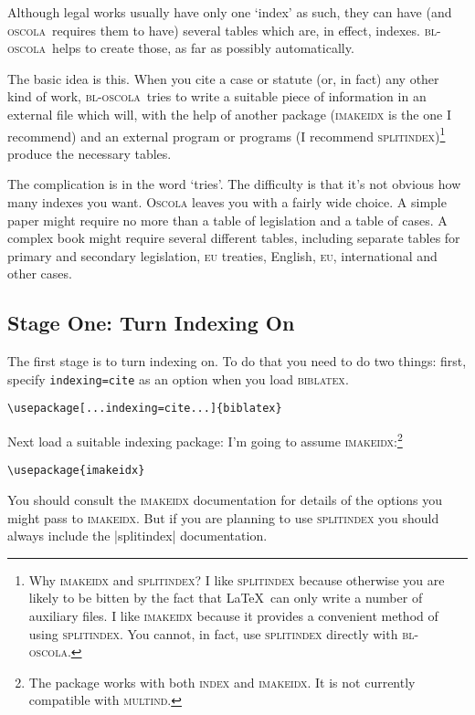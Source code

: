 \documentclass[a4paper,
               11pt,
	       DIV=1,			   
	       footinclude=false]
	      {scrartcl}
\newcommand{\oscola}{\textsc{bl-oscola}}
\newcommand{\biblatex}{\textsc{biblatex}}
\newcommand{\oscolashort}{\textsc{oscola}\nocite{oscola}}
\begin{document}
Although legal works usually have only one `index' as such, they can
have (and \oscolashort\ requires them to have) several
tables which are, in effect, indexes. \oscola\ helps to create those,
as far as possibly automatically.

The basic idea is this. When you cite a case or statute (or, in fact)
any other kind of work, \oscola\ tries to write a suitable piece of
information in an external file which will, with the help of another
package (\textsc{imakeidx} is the one I recommend) and an external
program or programs (I recommend \textsc{splitindex})\footnote{Why
\textsc{imakeidx} and \textsc{splitindex}? I like \textsc{splitindex}
because otherwise you are likely to be bitten by the fact that \LaTeX\
can only write a number of auxiliary files. I like \textsc{imakeidx}
because it provides a convenient method of using
\textsc{splitindex}. You cannot, in fact, use \textsc{splitindex}
directly with \oscola.} produce the necessary tables.

The complication is in the word `tries'. The difficulty is that it's
not obvious how many indexes you want. \textsc{Oscola} leaves you
with a fairly wide choice. A simple paper might require no more than a
table of legislation and a table of cases. A complex book might
require several different tables, including separate tables for
primary and secondary legislation, \textsc{eu} treaties, English,
\textsc{eu}, international and other cases. 

\subsection{Stage One: Turn Indexing On}

The first stage is to turn indexing on. To do that you need to do two
things: first, specify \texttt{indexing=cite} as an option when you
load \biblatex.
\begin{center}
\verb|\usepackage[...indexing=cite...]{biblatex}|
\end{center}

Next load a suitable indexing package: I'm going to assume \textsc{imakeidx}:\footnote{The package works with both \textsc{index} and \textsc{imakeidx}. It is not currently compatible with \textsc{multind}.}
\index[general]{imakeidx!recommended}
\begin{center}
\verb|\usepackage{imakeidx}|
\end{center}
You should consult the \textsc{imakeidx} documentation for details of
the options you might pass to \textsc{imakeidx}. But if you are
planning to use \textsc{splitindex} you should always include the
|splitindex| documentation.
\end{document}
